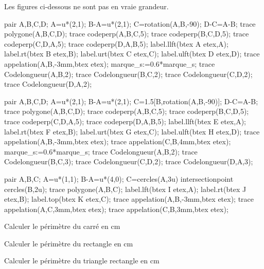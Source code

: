 \begin{exercice}
Les figures ci-dessous ne sont pas en vraie grandeur.\\
\begin{Geometrie}
   pair A,B,C,D;
   A=u*(2,1);
   B-A=u*(2,1);
   C=rotation(A,B,-90);
   D-C=A-B;
   trace polygone(A,B,C,D);
   trace codeperp(A,B,C,5);
   trace codeperp(B,C,D,5);
   trace codeperp(C,D,A,5);
   trace codeperp(D,A,B,5);
   label.llft(btex A etex,A);
   label.rt(btex B etex,B);
   label.urt(btex C etex,C);
   label.ulft(btex D etex,D);
   trace appelation(A,B,-3mm,btex  etex);
   marque_s:=0.6*marque_s;
   trace Codelongueur(A,B,2);
   trace Codelongueur(B,C,2);
   trace Codelongueur(C,D,2);
   trace Codelongueur(D,A,2);
\end{Geometrie}
\hfill
\begin{Geometrie}
   pair A,B,C,D;
   A=u*(2,1);
   B-A=u*(2,1);
   C=1.5[B,rotation(A,B,-90)];
   D-C=A-B;
   trace polygone(A,B,C,D);
   trace codeperp(A,B,C,5);
   trace codeperp(B,C,D,5);
   trace codeperp(C,D,A,5);
   trace codeperp(D,A,B,5);
   label.llft(btex E etex,A);
   label.rt(btex F etex,B);
   label.urt(btex G etex,C);
   label.ulft(btex H etex,D);
   trace appelation(A,B,-3mm,btex  etex);
   trace appelation(C,B,4mm,btex  etex);
   marque_s:=0.6*marque_s;
   trace Codelongueur(A,B,2);
   trace Codelongueur(B,C,3);
   trace Codelongueur(C,D,2);
   trace Codelongueur(D,A,3);
\end{Geometrie}
\hfill
\begin{Geometrie}
   pair A,B,C;
   A=u*(1,1);
   B-A=u*(4,0);
   C=cercles(A,3u) intersectionpoint cercles(B,2u);
   trace polygone(A,B,C);
   label.lft(btex I etex,A);
   label.rt(btex J etex,B);
   label.top(btex K etex,C);   
   trace appelation(A,B,-3mm,btex  etex);
   trace appelation(A,C,3mm,btex  etex);
   trace appelation(C,B,3mm,btex  etex);
\end{Geometrie}
\begin{enumerate}
   \begin{spacing}{1.5}
      \item Calculer le périmètre du carré en cm
      \item Calculer le périmètre du rectangle en cm
      \item Calculer le périmètre du triangle rectangle en cm
   \end{spacing}
\end{enumerate}

 \end{exercice}

